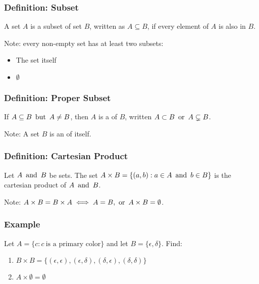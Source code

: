 \subsubsection*{Definition: Subset}
A set $A$ is a subset of set $B$, written as $A \subseteq B$, if every element of $A$ is also in $B$.

Note: every non-empty set has at least two subsets:
\begin{itemize}
    \item The set itself
    \item $\emptyset$
\end{itemize}

\subsubsection*{Definition: Proper Subset}
If $A \subseteq B \operatorname{~\text{but}~} A \not = B$, then $A$ is a  of $B$, written $A \subset B \operatorname{~\text{or}~} A \subsetneq B$.

Note: A set $B$ is an  of itself.

\subsubsection*{Definition: Cartesian Product}
Let $A \operatorname{~\text{and}~} B$ be sets. The set $A \times B = \{(a,b) : a \in A \operatorname{~\text{and}~} b \in B\}$ is the cartesian product of $A \operatorname{~\text{and}~} B$.

Note: $A \times B = B \times A \iff A = B, \operatorname{~\text{or}~} A \times B = \emptyset$.

\subsubsection*{Example}
Let $A = \{c : c ~\text{is a primary color}\}$ and let $B = \{\epsilon, \delta\}$. Find:
\begin{enumerate}
    \item $B \times B = \{(\epsilon, \epsilon),(\epsilon,\delta),(\delta,\epsilon),(\delta,\delta)\}$
    \item $A \times \emptyset = \emptyset$
\end{enumerate}